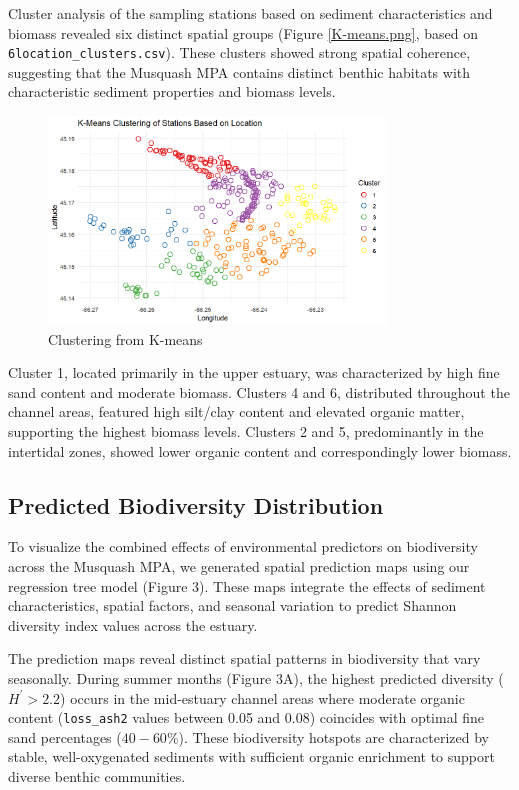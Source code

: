 \documentclass[12pt]{article}
\begin{document}
\qquad Cluster analysis of the sampling stations based on sediment
characteristics and biomass revealed six distinct spatial groups (Figure \ref{K-means.png},
based on \texttt{6location\_clusters.csv}). These clusters showed strong spatial
coherence, suggesting that the Musquash MPA contains distinct benthic habitats
with characteristic sediment properties and biomass levels.

\begin{figure}[H]
    \centering
    \includegraphics[width=0.8\textwidth]{K-means.png}
    \caption{Clustering from K-means}
    \label{fig:K-means}
    \end{figure}


\qquad Cluster 1, located primarily in the upper estuary, was characterized by
high fine sand content and moderate biomass. Clusters 4 and 6, distributed
throughout the channel areas, featured high silt/clay content and elevated
organic matter, supporting the highest biomass levels. Clusters 2 and 5,
predominantly in the intertidal zones, showed lower organic content and
correspondingly lower biomass.

\subsection{Predicted Biodiversity Distribution}

\qquad To visualize the combined effects of environmental predictors on
biodiversity across the Musquash MPA, we generated spatial prediction maps using
our regression tree model (Figure 3). These maps integrate the effects of
sediment characteristics, spatial factors, and seasonal variation to predict
Shannon diversity index values across the estuary.


\qquad The prediction maps reveal distinct spatial patterns in biodiversity that
vary seasonally. During summer months (Figure 3A), the highest predicted
diversity ($H^{\prime} > 2.2$) occurs in the mid-estuary channel areas where
moderate organic content (\texttt{loss\_ash2} values between 0.05 and 0.08)
coincides with optimal fine sand percentages ($40-60\%$). These biodiversity
hotspots are characterized by stable, well-oxygenated sediments with sufficient
organic enrichment to support diverse benthic communities.
\end{document}
